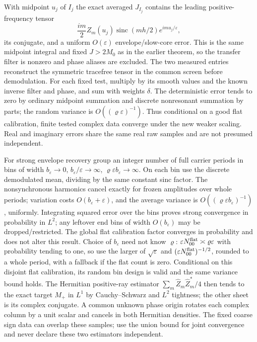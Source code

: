 \documentclass[11pt]{article}
\begin{document}
With midpoint \(u_j\) of \(I_j\) the exact averaged \(J_{I_j}\) contains the leading positive-frequency tensor
\[
 \frac{im}{2}Z_m(u_j)\operatorname{sinc}(mh/2)e^{imu_j/\varepsilon},
\]
its conjugate, and a uniform \(O(\varepsilon)\) envelope/slow-core error. This is the same midpoint integral and fixed \(J>2M_0\) as in the earlier theorem, so the transfer filter is nonzero and phase aliases are excluded. The two measured entries reconstruct the symmetric tracefree tensor in the common screen before demodulation. For each fixed test, multiply by its smooth values and the known inverse filter and phase, and sum with weights \(\delta\). The deterministic error tends to zero by ordinary midpoint summation and discrete nonresonant summation by parts; the random variance is \(O((\varrho\varepsilon)^{-1})\). Thus conditional on a good flat calibration, finite tested complex data converge under the new weaker scaling. Real and imaginary errors share the same real raw samples and are not presumed independent.

For strong envelope recovery group an integer number of full carrier periods in bins of width \(b_\varepsilon\to0\), \(b_\varepsilon/\varepsilon\to\infty\), \(\varrho\varepsilon b_\varepsilon\to\infty\). On each bin use the discrete demodulated mean, dividing by the same constant sinc factor. The nonsynchronous harmonics cancel exactly for frozen amplitudes over whole periods; variation costs \(O(b_\varepsilon+\varepsilon)\), and the average variance is \(O((\varrho\varepsilon b_\varepsilon)^{-1})\), uniformly. Integrating squared error over the bins proves strong convergence in probability in \(L^2\); any leftover end bins of width \(O(b_\varepsilon)\) may be dropped/restricted. The global flat calibration factor converges in probability and does not alter this result. Choice of \(b_\varepsilon\) need not know \(\varrho\): \(\varepsilon N_{00}^{\rm flat}\asymp\varrho\varepsilon\) with probability tending to one, so use the larger of \(\sqrt\varepsilon\) and \((\varepsilon N_{00}^{\rm flat})^{-1/2}\), rounded to a whole period, with a fallback if the flat count is zero. Conditional on this disjoint flat calibration, its random bin design is valid and the same variance bound holds. The Hermitian positive-ray estimator \(\sum_m\widehat Z_m\widehat Z_m^*/4\) then tends to the exact target \(M_+\) in \(L^1\) by Cauchy--Schwarz and \(L^2\) tightness; the other sheet is its complex conjugate. A common unknown phase origin rotates each complex column by a unit scalar and cancels in both Hermitian densities. The fixed coarse sign data can overlap these samples; use the union bound for joint convergence and never declare these two estimators independent.
\end{document}
